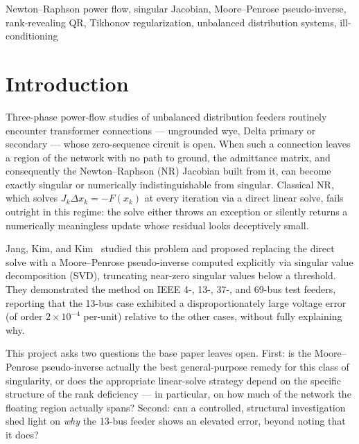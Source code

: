 \documentclass[conference]{IEEEtran}
\begin{document}
\begin{IEEEkeywords}
Newton--Raphson power flow, singular Jacobian, Moore--Penrose pseudo-inverse,
rank-revealing QR, Tikhonov regularization, unbalanced distribution systems,
ill-conditioning
\end{IEEEkeywords}

\section{Introduction}
\label{sec:intro}

Three-phase power-flow studies of unbalanced distribution feeders
routinely encounter transformer connections --- ungrounded wye, Delta
primary or secondary --- whose zero-sequence circuit is open. When such a
connection leaves a region of the network with no path to ground, the
admittance matrix, and consequently the Newton--Raphson (NR) Jacobian
built from it, can become exactly singular or numerically indistinguishable
from singular. Classical NR, which solves $J_k \Delta x_k = -F(x_k)$ at
every iteration via a direct linear solve, fails outright in this regime:
the solve either throws an exception or silently returns a numerically
meaningless update whose residual looks deceptively small.

Jang, Kim, and Kim~\cite{jang2023singularity} studied this problem and
proposed replacing the direct solve with a Moore--Penrose pseudo-inverse
computed explicitly via singular value decomposition (SVD), truncating
near-zero singular values below a threshold. They demonstrated the method
on IEEE 4-, 13-, 37-, and 69-bus test feeders, reporting that the 13-bus
case exhibited a disproportionately large voltage error (of order
$2\times10^{-4}$ per-unit) relative to the other cases, without fully
explaining why.

This project asks two questions the base paper leaves open. First: is the
Moore--Penrose pseudo-inverse actually the best general-purpose remedy for
this class of singularity, or does the appropriate linear-solve strategy
depend on the specific structure of the rank deficiency --- in particular,
on how much of the network the floating region actually spans? Second: can
a controlled, structural investigation shed light on \emph{why} the 13-bus
feeder shows an elevated error, beyond noting that it does?
\end{document}
